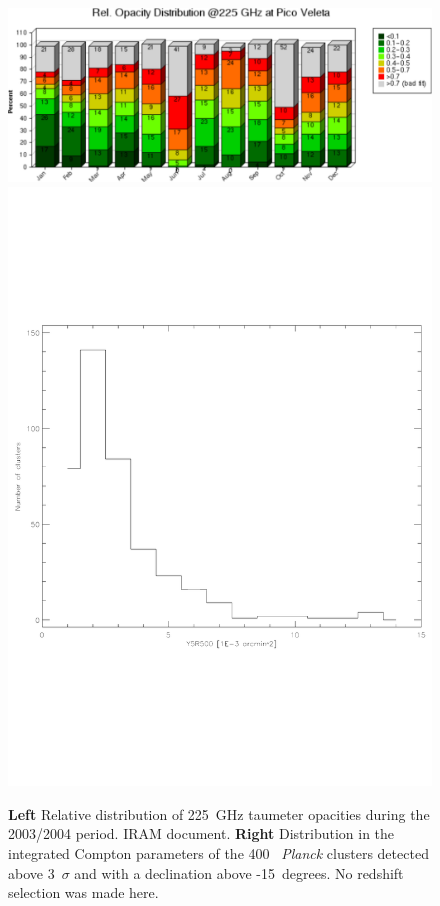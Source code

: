 \documentclass[11pt,a4paper,twoside,graphicx,color]{article}
\begin{document}
\begin{figure}
  \begin{center}
   \includegraphics[width=0.35\columnwidth]{./Figures/RelTau2004Crop.pdf}
\includegraphics[width=0.35\columnwidth]{./Figures/Arsenal_SZclusters.pdf}
  \end{center}
  \caption{{\bf Left} Relative distribution of 225~GHz taumeter
    opacities during the 2003/2004 period. IRAM document.  {\bf Right}
    Distribution in the integrated Compton parameters of the 400~{\sl
      Planck} clusters detected above 3~$\sigma$ and with a
    declination above -15~degrees. No redshift selection was made
    here. }
\label{Fig:RelTau}
\end{figure}

\end{document}

